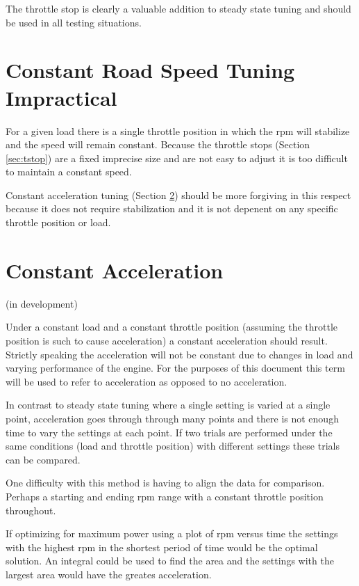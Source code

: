 \documentclass{article}
\begin{document}
The throttle stop is clearly a valuable addition to steady
state tuning and should be used in all testing situations.

\section{Constant Road Speed Tuning Impractical}

For a given load there is a single throttle position in which
the rpm will stabilize and the speed will remain constant.
Because the throttle stops (Section \ref{sec:tstop}) are a fixed
imprecise size and are not easy to adjust it is too difficult
to maintain a constant speed.

Constant acceleration tuning (Section \ref{sec:conacc})
should be more forgiving in this respect because it does not require
stabilization and it is not depenent on any specific throttle position
or load.

\section{Constant Acceleration}
\label{sec:conacc}
(in development)

Under a constant load and a constant throttle position
(assuming the throttle position is such to cause acceleration)
a constant acceleration should result.
Strictly speaking the acceleration will not be constant due to
changes in load and varying performance of the engine.
For the purposes of this document this term will be used to
refer to acceleration as opposed to no acceleration.

In contrast to steady state tuning where a single setting is varied
at a single point, acceleration goes through through many points
and there is not enough time to vary the settings at each point.
If two trials are performed under the same conditions (load and throttle
position) with different settings these trials can be compared.

One difficulty with this method is having to align the data for comparison.
Perhaps a starting and ending rpm range with a constant throttle position
throughout.

If optimizing for maximum power using a plot of rpm versus time the settings
with the highest rpm in the shortest period of time would be the optimal
solution.  An integral could be used to find the area and the settings with
the largest area would have the greates acceleration.
\end{document}
